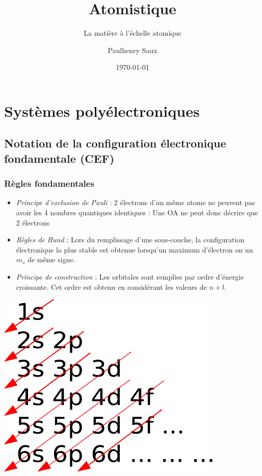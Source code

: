 \documentclass[french]{yLectureNote}
\title{Atomistique}
\subtitle{La matière à l'échelle atomique}
\author{Paulhenry Saux}
\date{\today}
\begin{document}
\setcounter{chapter}{2}

	\chapter{Systèmes polyélectroniques}
	\section{Notation de la configuration électronique fondamentale (CEF)}
	\subsection{Règles fondamentales}
	\begin{theorem}
	\begin{itemize}
	 \item \emph{Principe d'exclusion de Pauli} : 2 électrons d'un m\^eme atome ne peuvent pas avoir les 4 nombres quantiques identiques : Une OA ne peut donc décrire que 2 électrons
	 \item \emph{Règles de Hund} : Lors du remplissage d'une sous-couche, la configuration électronique la plus stable est obtenue lorsqu'un maximum d'électron on un $m_s$ de m\^eme signe.
	 \item \emph{Principe de construction} : Les orbitales sont remplies par ordre d'énergie croissante. Cet ordre est obtenu en considérant les valeurs de $n+l$.
	\end{itemize}


\end{theorem}

\begin{multicols}{2}

 \columnbreak

\includegraphics[scale=0.5]{rule}

\end{multicols}
\end{document}
